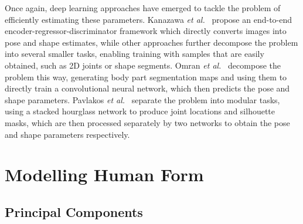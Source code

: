 \documentclass[9pt,twocolumn]{article}
\begin{document}
	\par{Once again, deep learning approaches have emerged to tackle the problem of efficiently
	estimating these parameters. Kanazawa \textit{et al.}~\cite{hmr} propose an end-to-end
	encoder-regressor-discriminator framework which directly converts images into pose and
	shape estimates, while other approaches further decompose the problem into several smaller
	tasks, enabling training with samples that are easily obtained, such as 2D joints or shape
	segments. Omran \textit{et al.}~\cite{nbf} decompose the problem this way, generating
	body part segmentation maps and using them to directly train a convolutional neural network,
	which then predicts the pose and shape parameters. Pavlakos \textit{et al.}~\cite{humanshape}
	separate the problem into modular tasks, using a stacked hourglass network to produce joint
	locations and silhouette masks, which are then processed separately by two networks to
	obtain the pose and shape parameters respectively.}








\section{Modelling Human Form}

	\subsection{Principal Components}
\end{document}
